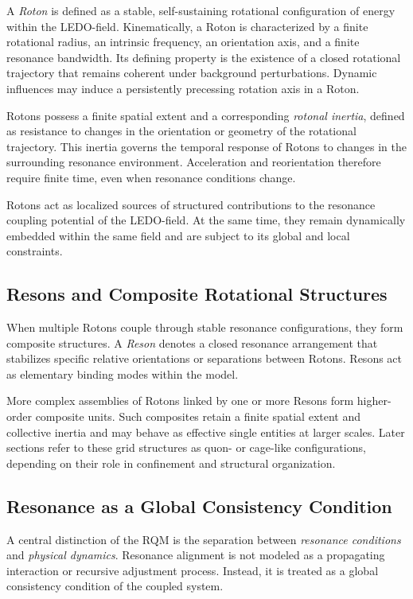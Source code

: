 \documentclass[11pt,a4paper]{article}
\begin{document}
A \emph{Roton} is defined as a stable, self-sustaining rotational configuration of energy
within the LEDO-field.
Kinematically, a Roton is characterized by a finite rotational radius, an intrinsic
frequency, an orientation axis, and a finite resonance bandwidth.
Its defining property is the existence of a closed rotational trajectory that remains
coherent under background perturbations. Dynamic influences may induce a persistently precessing rotation axis in a Roton.

Rotons possess a finite spatial extent and a corresponding \emph{rotonal inertia}, defined
as resistance to changes in the orientation or geometry of the rotational trajectory.
This inertia governs the temporal response of Rotons to changes in the surrounding
resonance environment.
Acceleration and reorientation therefore require finite time, even when resonance
conditions change.

Rotons act as localized sources of structured contributions to the resonance coupling potential of
the LEDO-field.
At the same time, they remain dynamically embedded within the same field and are subject
to its global and local constraints.

\subsection{Resons and Composite Rotational Structures}

When multiple Rotons couple through stable resonance configurations, they form composite
structures.
A \emph{Reson} denotes a closed resonance arrangement that stabilizes specific relative
orientations or separations between Rotons.
Resons act as elementary binding modes within the model.

More complex assemblies of Rotons linked by one or more Resons form higher-order composite
units.
Such composites retain a finite spatial extent and collective inertia and may behave as
effective single entities at larger scales.
Later sections refer to these grid structures as quon- or cage-like configurations, depending
on their role in confinement and structural organization.

\subsection{Resonance as a Global Consistency Condition}

A central distinction of the RQM is the separation between \emph{resonance conditions} and
\emph{physical dynamics}.
Resonance alignment is not modeled as a propagating interaction or recursive adjustment
process.
Instead, it is treated as a global consistency condition of the coupled system.
\end{document}
